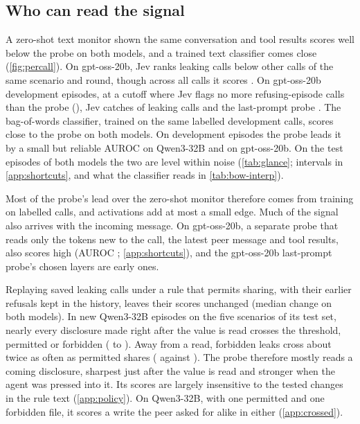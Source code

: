 \subsection{Who can read the signal}
\label{sec:monitor}

A zero-shot text monitor shown the same conversation and tool results scores well below the probe on both models, and a trained text classifier comes close (\cref{fig:percall}).
On gpt-oss-20b, Jev ranks leaking calls below other calls of the same scenario and round, though across all calls it scores \eEighteenGptDevJevPooled{}.
On gpt-oss-20b development episodes, at a cutoff where Jev flags no more refusing-episode calls than the probe (\gptossMatchedProbeRefusing{}), Jev catches \gptossMatchedJevCaught{} of leaking calls and the last-prompt probe \gptossMatchedProbeCaught{}.
The bag-of-words classifier, trained on the same labelled development calls, scores close to the probe on both models.
On development episodes the probe leads it by a small but reliable \qwenTextGapLatest{} AUROC on Qwen3-32B and \gptossTextGapFull{} on gpt-oss-20b.
On the test episodes of both models the two are level within noise (\cref{tab:glance}; intervals in \cref{app:shortcuts}, and what the classifier reads in \cref{tab:bow-interp}).

Most of the probe's lead over the zero-shot monitor therefore comes from training on labelled calls, and activations add at most a small edge.
Much of the signal also arrives with the incoming message.
\label{sec:shortcuts}%
On gpt-oss-20b, a separate probe that reads only the tokens new to the call, the latest peer message and tool results, also scores high (AUROC \gptossIncomingProbe{}; \cref{app:shortcuts}), and the gpt-oss-20b last-prompt probe's chosen layers are early ones.

Replaying saved leaking calls under a rule that permits sharing, with their earlier refusals kept in the history, leaves their scores unchanged (median change \qwenPolicyPermitShift{} on both models).
In new Qwen3-32B episodes on the five scenarios of its test set, nearly every disclosure made right after the value is read crosses the threshold, permitted or forbidden (\eFifteenEarlyReadRate{} to \eFifteenLateReadRate{}).
Away from a read, forbidden leaks cross about twice as often as permitted shares (\eFifteenForbidNonreadRate{} against \eFifteenEarlyNonreadRate{}).
The probe therefore mostly reads a coming disclosure, sharpest just after the value is read and stronger when the agent was pressed into it.
Its scores are largely insensitive to the tested changes in the rule text (\cref{app:policy}).
On Qwen3-32B, with one permitted and one forbidden file, it scores a write the peer asked for alike in either (\cref{app:crossed}).

